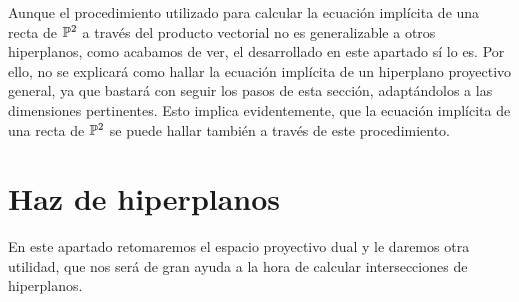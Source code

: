 \begin{obs}
	Aunque el procedimiento utilizado para calcular la ecuación implícita de una recta de $\mathbb{P}^2$ a través del producto vectorial no es generalizable a otros hiperplanos, como acabamos de ver, el desarrollado en este apartado sí lo es. Por ello, no se explicará como hallar la ecuación implícita de un hiperplano proyectivo general, ya que bastará con seguir los pasos de esta sección, adaptándolos a las dimensiones pertinentes. Esto implica evidentemente, que la ecuación implícita de una recta de $\mathbb{P}^2$ se puede hallar también a través de este procedimiento.
\end{obs}

\section{Haz de hiperplanos}
En este apartado retomaremos el espacio proyectivo dual y le daremos otra utilidad, que nos será de gran ayuda a la hora de calcular intersecciones de hiperplanos.

